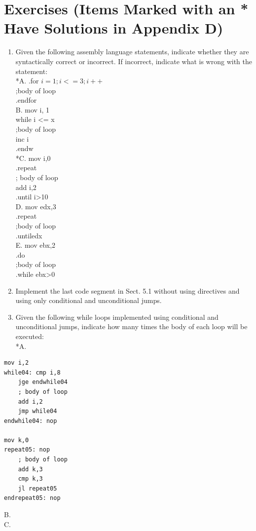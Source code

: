 \documentclass[10pt]{book}
\begin{document}
\section{Exercises (Items Marked with an * Have Solutions in Appendix D)}
\begin{enumerate}
  \item Given the following assembly language statements, indicate whether they are syntactically correct or incorrect. If incorrect, indicate what is wrong with the statement:\\
*A. .for $i=1 ; i<=3 ; i++$\\
;body of loop\\
.endfor\\
B. mov i, 1\\
while i <= x\\
;body of loop\\
inc i\\
.endw\\
*C. mov i,0\\
.repeat\\
; body of loop\\
add i,2\\
.until i>10\\
D. mov edx,3\\
.repeat\\
;body of loop\\
.untiledx\\
E. mov ebx,2\\
.do\\
;body of loop\\
.while ebx>0
  \item Implement the last code segment in Sect. 5.1 without using directives and using only conditional and unconditional jumps.
  \item Given the following while loops implemented using conditional and unconditional jumps, indicate how many times the body of each loop will be executed:\\
*A.
\end{enumerate}

\begin{verbatim}
mov i,2
while04: cmp i,8
    jge endwhile04
    ; body of loop
    add i,2
    jmp while04
endwhile04: nop

mov k,0
repeat05: nop
    ; body of loop
    add k,3
    cmp k,3
    jl repeat05
endrepeat05: nop
\end{verbatim}

B.\\
C.
\end{document}
